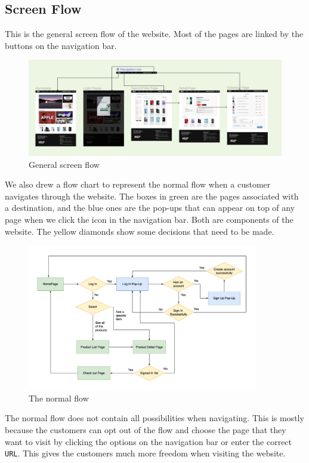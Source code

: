 \documentclass[a4paper]{article}
\numberwithin{equation}{section}
\begin{document}
\newpage
\subsection{Screen Flow}

This is the general screen flow of the website.
Most of the pages are linked by the buttons on the navigation bar.

\begin{figure}[H]
  \centering
  \includegraphics[width=1\textwidth]{assets/p2/screenflow.png}
  \caption{General screen flow}
\end{figure}

We also drew a flow chart to represent the normal flow when a customer navigates through the website.
The boxes in green are the pages associated with a destination, and the blue ones are the pop-ups that can appear on top of any page when we click the icon in the navigation bar.
Both are components of the website.
The yellow diamonds show some decisions that need to be made.

\begin{figure}[H]
  \centering
  \includegraphics[width=0.9\textwidth]{assets/flow/flow-chart.png}
  \caption{The normal flow}
\end{figure}

The normal flow does not contain all possibilities when navigating.
This is mostly because the customers can opt out of the flow and choose the page that they want to visit by clicking the options on the navigation bar or enter the correct {\tt URL}.
This gives the customers much more freedom when visiting the website.
\end{document}
